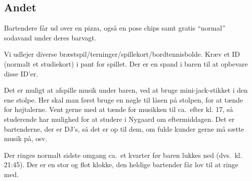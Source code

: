 \iffalse
Hvis man i slutningen af vagten har ryddet det meste væk, men så
opdager en pant-A-flaske/dåse el.lign.\ kan denne godt puttes i den
gennemsigtige/hvide plastkasse. Dog jo mere, der puttes i denne, desto
mere skal pantvagten manuelt pante, så prøv at begrænse det.
\fi

\subsection{Andet}
\label{sec:intra:andet}

Bartendere får ud over en pizza, også en pose chips samt gratis
``normal'' sodavand under deres barvagt.

Vi udlejer diverse
bræstspil/terninger/spillekort/bordtennisbolde. Kræv et ID (normalt et
studiekort) i pant for spillet. Der er en spand i baren til at
opbevare disse ID'er.

Det er muligt at afspille musik under baren, ved at bruge
mini-jack-stikket i den ene stolpe. Her skal man først bruge en nøgle
til låsen på stolpen, for at tænde for højtalerne. Vent gerne med at
tænde for musikken til ca.\ efter kl. 17, så studerende har mulighed
for at studere i Nygaard om eftermiddagen. Det er bartenderne, der er
DJ's, så det er op til dem, om fulde kunder gerne må sætte musik på,
osv.

Der ringes normalt sidste omgang ca.\ et kvarter før baren lukkes ned
(dvs.\ kl. 21:45). Der er en stor og flot klokke, den heldige bartender
får lov til at ringe med.
